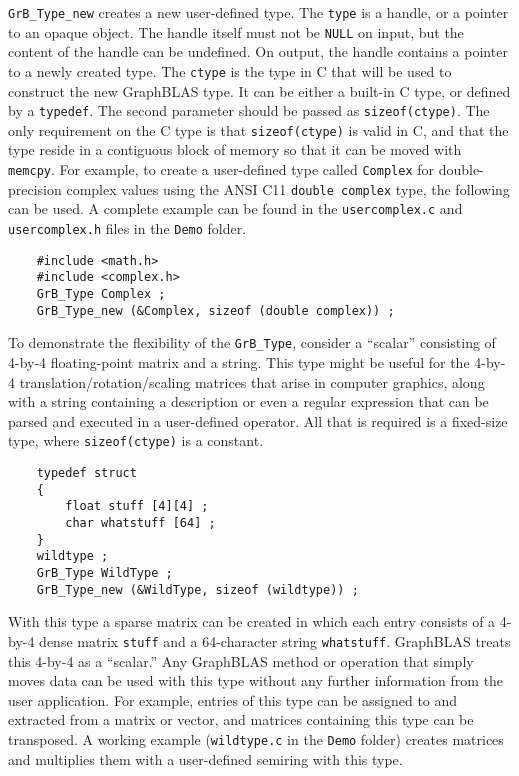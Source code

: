 \documentclass[12pt]{article}
\begin{document}
\verb'GrB_Type_new' creates a new user-defined type.  The \verb'type' is a
handle, or a pointer to an opaque object.  The handle itself must not be
\verb'NULL' on input, but the content of the handle can be undefined.  On
output, the handle contains a pointer to a newly created type.
The \verb'ctype' is the type in C that will be used to construct the new
GraphBLAS type.  It can be either a built-in C type, or defined by a
\verb'typedef'.
The second parameter should be passed as \verb'sizeof(ctype)'.  The only
requirement on the C type is that \verb'sizeof(ctype)' is valid in C, and
that the type reside in a contiguous block of memory so that it can be moved
with \verb'memcpy'.  For example, to create a user-defined type called
\verb'Complex' for double-precision complex values using the ANSI C11
\verb'double complex' type, the following can be used.  A complete example can
be found in the \verb'usercomplex.c' and \verb'usercomplex.h' files in the
\verb'Demo' folder.

    {\footnotesize
    \begin{verbatim}
    #include <math.h>
    #include <complex.h>
    GrB_Type Complex ;
    GrB_Type_new (&Complex, sizeof (double complex)) ;    \end{verbatim} }

To demonstrate the flexibility of the \verb'GrB_Type', consider a ``scalar''
consisting of 4-by-4 floating-point matrix and a string.  This type might be
useful for the 4-by-4 translation/rotation/scaling matrices that arise in
computer graphics, along with a string containing a description or even a
regular expression that can be parsed and executed in a user-defined operator.
All that is required is a fixed-size type, where \verb'sizeof(ctype)' is
a constant.

    {\footnotesize
    \begin{verbatim}
    typedef struct
    {
        float stuff [4][4] ;
        char whatstuff [64] ;
    }
    wildtype ;
    GrB_Type WildType ;
    GrB_Type_new (&WildType, sizeof (wildtype)) ; \end{verbatim} }

With this type a sparse matrix can be created in which each entry consists of a
4-by-4 dense matrix \verb'stuff' and a 64-character string \verb'whatstuff'.
GraphBLAS treats this 4-by-4 as a ``scalar.'' Any GraphBLAS method or operation
that simply moves data can be used with this type without any further
information from the user application.  For example, entries of this type can
be assigned to and extracted from a matrix or vector, and matrices containing
this type can be transposed.  A working example (\verb'wildtype.c'
in the \verb'Demo' folder) creates matrices and multiplies them with
a user-defined semiring with this type.
\end{document}
